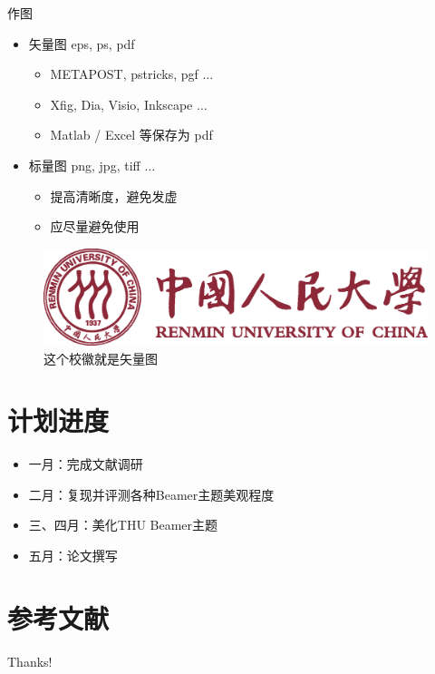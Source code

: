 \documentclass{ctexbeamer}
\begin{document}
\begin{frame}{作图}
  \begin{itemize}
    \item 矢量图 eps, ps, pdf
      \begin{itemize}
        \item METAPOST, pstricks, pgf $\ldots$
        \item Xfig, Dia, Visio, Inkscape $\ldots$
        \item Matlab / Excel 等保存为 pdf
      \end{itemize}
    \item 标量图 png, jpg, tiff $\ldots$
      \begin{itemize}
        \item 提高清晰度，避免发虚
        \item 应尽量避免使用
      \end{itemize}
  \end{itemize}
  \begin{figure}[htpb]
    \centering
    \includegraphics[width=0.2\linewidth]{RucBeamerAssets/Renmin_Univ_Logo.eps}
    \caption{这个校徽就是矢量图}
  \end{figure}
\end{frame}

\section{计划进度}
\begin{frame}
  \begin{itemize}
    \item 一月：完成文献调研
    \item 二月：复现并评测各种Beamer主题美观程度
    \item 三、四月：美化THU Beamer主题
    \item 五月：论文撰写
  \end{itemize}
\end{frame}

\section{参考文献}

\begin{frame}[allowframebreaks]
  
  
\end{frame}

\begin{frame}
  \begin{center}
    {\Huge\calligra Thanks!}
  \end{center}
\end{frame}
\end{document}
